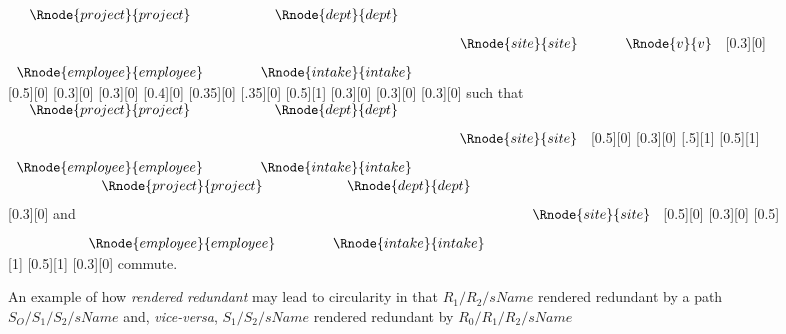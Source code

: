 \begin{figure} [h]  %
\begin{center}
$
\begin{array}{c p{0.75cm}c p{0.5cm}c p{0.5cm}c}
 \Rnode{project}{project}  && \Rnode{dept}{dept}  &&              &&              \\ [0.3cm]
	 	           &&               && \Rnode{site}{site} && \Rnode{v}{v} \\ [0.3cm]     
 \Rnode{employee}{employee}  && \Rnode{intake}{intake}  &&              &&              \\ 
\end{array}
$
[0.3][0]
\idcomp
{} 
[0.5][0]
[0.3][0]
\idcomp
{} 
[0.3][0]
\idcomp
{}
[0.4][0]
\idcomp
{}
[0.35][0]
[.35][0]
[0.5][1]
[0.3][0]
\idcomp
{}
[0.3][0]
\idcomp
{}
[0.3][0]
\idcomp
\vspace{1.5cm}
\newline
such that \hspace{0.5cm}
$
\begin{array}{c p{0.75cm}c p{0.5cm}c}
 \Rnode{project}{project}  && \Rnode{dept}{dept}  &&              \\ [0.3cm]
	 	           &&               && \Rnode{site}{site}  \\ [0.3cm]     
 \Rnode{employee}{employee}  && \Rnode{intake}{intake}  &&              \\ 
\end{array}
$
[0.5][0]
[0.3][0]
\idcomp
{}
[.5][1]
[0.5][1]
[0.3][0]
\idcomp
\hspace {0.25cm} and \hspace{0.5cm}
$
\begin{array}{c p{0.75cm}c p{0.5cm}c}
 \Rnode{project}{project}  && \Rnode{dept}{dept}  &&              \\ [0.3cm]
	 	           &&               && \Rnode{site}{site}  \\ [0.3cm]     
 \Rnode{employee}{employee}  && \Rnode{intake}{intake}  &&               \\ 
\end{array}
$
[0.5][0]
[0.3][0]
\idcomp
{}
[0.5][1]
[0.5][1]
[0.3][0]
\idcomp
\hspace{0.2cm} commute.

\end{center}
\caption{An example  of how \textit{rendered redundant} may lead to circularity in that
$R_1/R_2/sName$  rendered redundant by a path $S_O/S_1/S_2/sName$  and, \textit{vice-versa}, 
$S_1/S_2/sName$ rendered redundant by $R_0/R_1/R_2/sName$}
\label{employeeintake}
\end{figure}